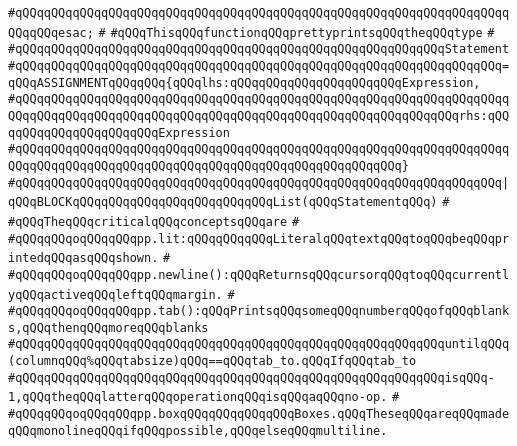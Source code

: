 \verb|#qQQqqQQqqQQqqQQqqQQqqQQqqQQqqQQqqQQqqQQqqQQqqQQqqQQqqQQqqQQqqQQqqQQqqQQqqQQqesac;|\newline
\verb|#|\newline
\verb|#qQQqThisqQQqfunctionqQQqprettyprintsqQQqtheqQQqtype|\newline
\verb|#|\newline
\verb|#qQQqqQQqqQQqqQQqqQQqqQQqqQQqqQQqqQQqqQQqqQQqqQQqqQQqqQQqqQQqStatement|\newline
\verb|#qQQqqQQqqQQqqQQqqQQqqQQqqQQqqQQqqQQqqQQqqQQqqQQqqQQqqQQqqQQqqQQqqQQq=qQQqASSIGNMENTqQQqqQQq{qQQqlhs:qQQqqQQqqQQqqQQqqQQqqQQqExpression,|\newline
\verb|#qQQqqQQqqQQqqQQqqQQqqQQqqQQqqQQqqQQqqQQqqQQqqQQqqQQqqQQqqQQqqQQqqQQqqQQqqQQqqQQqqQQqqQQqqQQqqQQqqQQqqQQqqQQqqQQqqQQqqQQqqQQqqQQqqQQqrhs:qQQqqQQqqQQqqQQqqQQqqQQqExpression|\newline
\verb|#qQQqqQQqqQQqqQQqqQQqqQQqqQQqqQQqqQQqqQQqqQQqqQQqqQQqqQQqqQQqqQQqqQQqqQQqqQQqqQQqqQQqqQQqqQQqqQQqqQQqqQQqqQQqqQQqqQQqqQQqqQQq}|\newline
\verb|#qQQqqQQqqQQqqQQqqQQqqQQqqQQqqQQqqQQqqQQqqQQqqQQqqQQqqQQqqQQqqQQqqQQq|\verb#|qQQqBLOCKqQQqqQQqqQQqqQQqqQQqqQQqqQQqList(qQQqStatementqQQq)#\newline
\verb|#|\newline
\verb|#qQQqTheqQQqcriticalqQQqconceptsqQQqare|\newline
\verb|#|\newline
\verb|#qQQqqQQqoqQQqqQQqpp.lit:qQQqqQQqqQQqLiteralqQQqtextqQQqtoqQQqbeqQQqprintedqQQqasqQQqshown.|\newline
\verb|#|\newline
\verb|#qQQqqQQqoqQQqqQQqpp.newline():qQQqReturnsqQQqcursorqQQqtoqQQqcurrentlyqQQqactiveqQQqleftqQQqmargin.|\newline
\verb|#|\newline
\verb|#qQQqqQQqoqQQqqQQqpp.tab():qQQqPrintsqQQqsomeqQQqnumberqQQqofqQQqblanks,qQQqthenqQQqmoreqQQqblanks|\newline
\verb|#qQQqqQQqqQQqqQQqqQQqqQQqqQQqqQQqqQQqqQQqqQQqqQQqqQQqqQQqqQQquntilqQQq(columnqQQq%qQQqtabsize)qQQq==qQQqtab_to.qQQqIfqQQqtab_to|\newline
\verb|#qQQqqQQqqQQqqQQqqQQqqQQqqQQqqQQqqQQqqQQqqQQqqQQqqQQqqQQqqQQqisqQQq-1,qQQqtheqQQqlatterqQQqoperationqQQqisqQQqaqQQqno-op.|\newline
\verb|#|\newline
\verb|#qQQqqQQqoqQQqqQQqpp.boxqQQqqQQqqQQqqQQqBoxes.qQQqTheseqQQqareqQQqmadeqQQqmonolineqQQqifqQQqpossible,qQQqelseqQQqmultiline.|\newline
